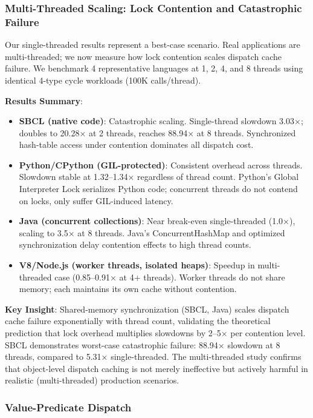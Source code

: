 \documentclass[sigplan,final,acmsmall,review,screen]{acmart}
\begin{document}
\subsubsection{Multi-Threaded Scaling: Lock Contention and Catastrophic Failure}

Our single-threaded results represent a best-case scenario. Real applications are multi-threaded; we now measure how lock contention scales dispatch cache failure.
We benchmark 4 representative languages at 1, 2, 4, and 8 threads using identical 4-type cycle workloads (100K calls/thread).

\textbf{Results Summary}:
\begin{itemize}
  \item \textbf{SBCL (native code)}: Catastrophic scaling. Single-thread slowdown 3.03×; doubles to 20.28× at 2 threads, reaches 88.94× at 8 threads.
    Synchronized hash-table access under contention dominates all dispatch cost.
  \item \textbf{Python/CPython (GIL-protected)}: Consistent overhead across threads. Slowdown stable at 1.32--1.34× regardless of thread count.
    Python's Global Interpreter Lock serializes Python code; concurrent threads do not contend on locks, only suffer GIL-induced latency.
  \item \textbf{Java (concurrent collections)}: Near break-even single-threaded (1.0×), scaling to 3.5× at 8 threads.
    Java's ConcurrentHashMap and optimized synchronization delay contention effects to high thread counts.
  \item \textbf{V8/Node.js (worker threads, isolated heaps)}: Speedup in multi-threaded case (0.85--0.91× at 4+ threads).
    Worker threads do not share memory; each maintains its own cache without contention.
\end{itemize}

\textbf{Key Insight}: Shared-memory synchronization (SBCL, Java) scales dispatch cache failure exponentially with thread count, validating the theoretical prediction that lock overhead multiplies slowdowns by 2--5× per contention level.
SBCL demonstrates worst-case catastrophic failure: 88.94× slowdown at 8 threads, compared to 5.31× single-threaded.
The multi-threaded study confirms that object-level dispatch caching is not merely ineffective but actively harmful in realistic (multi-threaded) production scenarios.

\subsubsection{Value-Predicate Dispatch}
\end{document}
